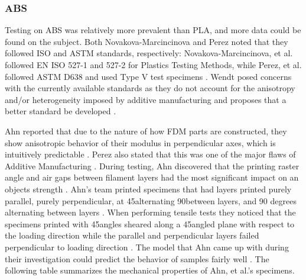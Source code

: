 \subsubsection{ABS}
	Testing on ABS was relatively more prevalent than PLA, and more data could be found on the subject. Both Novakova-Marcincinova and Perez noted that they followed ISO and ASTM standards, respectively: Novakova-Marcincinova, et al. followed EN ISO 527-1 and 527-2 for Plastics Testing Methods, while Perez, et al. followed ASTM D638 and used Type V test specimens \citep{Novakova-Marcincinova2013, TorradoPerez2014}. Wendt posed concerns with the currently available standards as they do not account for the anisotropy and/or heterogeneity imposed by additive manufacturing and proposes that a better standard be developed \citep{Wendt2015}.\par
	Ahn reported that due to the nature of how FDM parts are constructed, they show anisotropic behavior of their modulus in perpendicular axes, which is intuitively predictable \citep{Ahn2003}. Perez also stated that this was one of the major flaws of Additive Manufacturing \citep{TorradoPerez2014}. During testing, Ahn discovered that the printing raster angle and air gaps between filament layers had the most significant impact on an objects strength \citep{Ahn2003}. Ahn's team printed specimens that had layers printed purely parallel, purely perpendicular, at 45\degree alternating 90\degree between layers, and 90 degrees alternating between layers \citep{Ahn2003}. When performing tensile tests they noticed that the specimens printed with 45\degree angles sheared along a 45\degree angled plane with respect to the loading direction while the parallel and perpendicular layers failed perpendicular to loading direction \citep{Ahn2003}. The model that Ahn came up with during their investigation could predict the behavior of samples fairly well \citep{Ahn2003}. The following table summarizes the mechanical properties of Ahn, et al.'s specimens.

